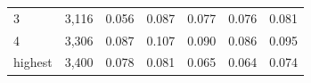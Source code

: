\begin{tabular}{lrrrrrr}
3 & 3,116 & 0.056 & 0.087 & 0.077 & 0.076 & 0.081 \\
4 & 3,306 & 0.087 & 0.107 & 0.090 & 0.086 & 0.095 \\
highest & 3,400 & 0.078 & 0.081 & 0.065 & 0.064 & 0.074 \\
\midrule

\end{tabular}
